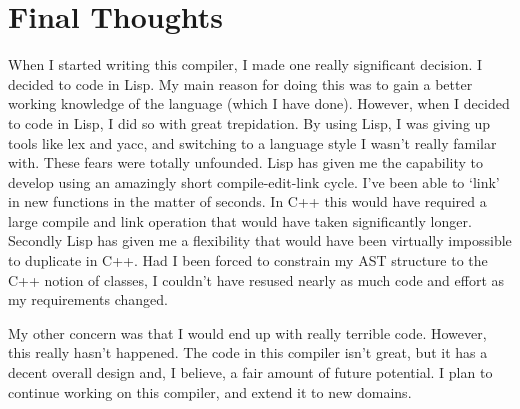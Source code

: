 \documentclass{article}[1994/05/24]
\begin{document}
\section{Final Thoughts}

	When I started writing this compiler, I made one really 
significant decision.  I decided to code in Lisp.  My main reason
for doing this was to gain a better working knowledge of the 
language (which I have done). However, when I decided to code in
Lisp, I did so with great trepidation.  By using Lisp, I was giving
up tools like lex and yacc, and switching to a language style I
wasn't really familar with. These fears were totally unfounded.
Lisp has given me the capability to develop using an amazingly short
compile-edit-link cycle.  I've been able to `link' in new functions
in the matter of seconds. In C++ this would have required a large
compile and link operation that would have taken significantly
longer.  Secondly Lisp has given me a flexibility that would have
been virtually impossible to duplicate in C++.  Had I been forced
to constrain my AST structure to the C++ notion of classes, I couldn't
have resused nearly as much code and effort as my requirements changed.

	My other concern was that I would end up with really
terrible code. However, this really hasn't happened. The code in
this compiler isn't great, but it has a decent overall design and,
I believe, a fair amount of future potential. I plan to continue
working on this compiler, and extend it to new domains.

\end{document}
